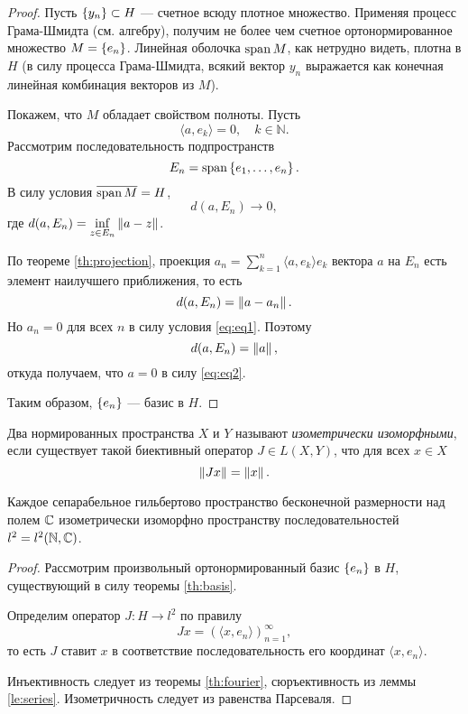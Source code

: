 \begin{proof}
    Пусть $\left\{y_n\right\} \subset H$ --- счетное всюду плотное множество. Применяя процесс Грама-Шмидта (см. алгебру), получим не более чем счетное 
    ортонормированное множество $M = \left\{e_n\right\}$. Линейная оболочка $\operatorname{span} M$,
    как нетрудно видеть, плотна в $H$ (в силу процесса Грама-Шмидта, всякий вектор $y_n$ 
    выражается как конечная линейная комбинация векторов из $M$). 

    Покажем, что $M$ обладает свойством полноты. Пусть 
    \begin{equation}\label{eq:eq1}
        \langle a, e_k \rangle = 0, \quad k \in \mathbb N.
    \end{equation}
    Рассмотрим последовательность подпространств
    \[ E_n = \operatorname{span} \left\{e_1, \dotsc, e_n\right\}. \] 
    В силу условия $\overline{\operatorname{span} M} = H$,
    \begin{equation}\label{eq:eq2}
        d(a, E_n) \to 0,
    \end{equation}    
    где $d(a, E_n) = \inf\limits_{z \in E_n} \left\|a - z\right\|$.

    По теореме \ref{th:projection}, проекция 
    $a_n = \sum\limits_{k=1}^n \langle a, e_k \rangle e_k$ 
    вектора $a$ на $E_n$ есть элемент наилучшего приближения, то есть
    \[ d(a, E_n) = \left\|a - a_n\right\|. \]
    Но $a_n = 0$ для всех $n$ в силу условия \eqref{eq:eq1}. Поэтому
    \[ d(a, E_n) = \left\|a\right\|, \]
    откуда получаем, что $a = 0$ в силу \eqref{eq:eq2}.

    Таким образом, $\left\{e_n\right\}$ --- базис в $H$.
\end{proof}

\begin{definition}
    Два нормированных пространства $X$ и $Y$ называют \emph{изометрически изоморфными}, если
    существует такой биективный оператор $J \in L(X, Y)$, что для всех $x \in X$
    \[ \left\|Jx\right\| = \left\|x\right\|. \]
\end{definition}

\begin{theorem}
    Каждое сепарабельное гильбертово пространство бесконечной размерности над полем $\mathbb{C}$
    изометрически изоморфно пространству последовательностей $l^2 = l^2(\mathbb N, \mathbb{C})$.
\end{theorem}

\begin{proof}
    Рассмотрим произвольный ортонормированный базис $\left\{e_n\right\}$ в $H$, существующий в силу теоремы \ref{th:basis}. 

    Определим оператор $J \colon H \to l^2$ по правилу
    \[ Jx = (\langle x, e_n \rangle)_{n=1}^\infty, \]
    то есть $J$ ставит $x$ в соответствие последовательность его 
    координат $\langle x, e_n \rangle$.

    Инъективность следует из теоремы \ref{th:fourier}, сюръективность из леммы \ref{le:series}.
    Изометричность следует из равенства Парсеваля.
\end{proof}

